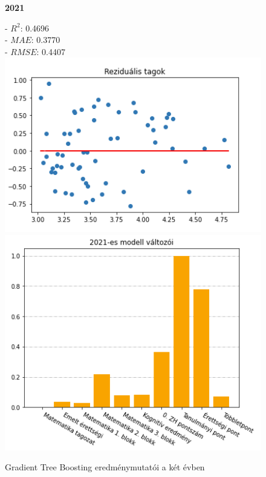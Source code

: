 \documentclass[12pt]{article}
\begin{document}
\begin{figure}[H]
    \begin{minipage}[b]{0.4\textwidth}
    \begin{center}
    \textbf{2021}
    \end{center}
    \raggedright
    - $R^2$: 0.4696 \\
    - $MAE$: 0.3770 \\
    - $RMSE$: 0.4407 \\
        \centering
        \includegraphics[width=1\textwidth, left]{kepek/residual2021_2.png} %
        \includegraphics[width=1\textwidth, left]{kepek/kumulalt2021_2.png} %
    \end{minipage}
   \caption{Gradient Tree Boosting eredménymutatói a két évben}
   \label{fig:kumulalt2}
\end{figure}
\end{document}

